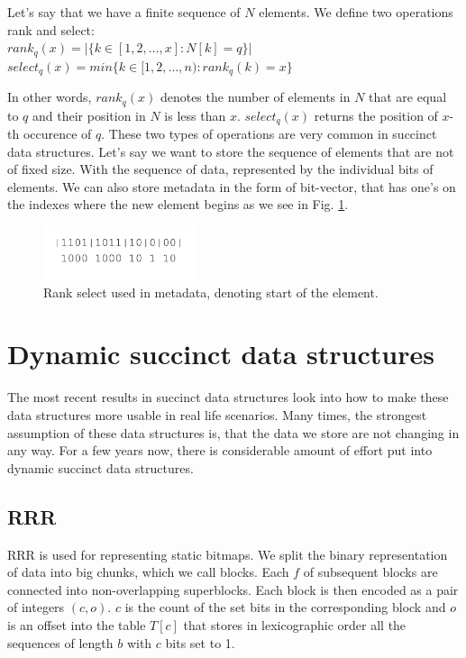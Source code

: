 \begin{theorem}
Let's say that we have a finite sequence of $N$ elements.
We define two operations rank and select: \\
$rank_q(x) = | \{ k \in [ 1, 2, \ldots, x]:N[k] = q  \} |$ \\
$select_q(x) = min \{ k \in [ 1, 2, \ldots, n):rank_q(k)=x  \} $
\end{theorem}

In other words, $rank_q(x)$ denotes the number of elements in $N$ that are equal to $q$ and their position in $N$ is less than $x$. $select_q(x)$ returns the position of $x$-th occurence of $q$.
These two types of operations are very common in succinct data structures. Let's say we want to store the sequence of elements that are not of fixed size.
With the sequence of data, represented by the individual bits of elements. We can also store metadata in the form of bit-vector, that has one's on the indexes
where the new element begins as we see in Fig. \ref{obr:obr_rank_select}.

\begin{figure}
\centerline{\includegraphics[width=0.4\textwidth]{images/obr_rank_select}}
\caption[Rank select usage in representation of sequence of elements with different size]{Rank select used in metadata, denoting start of the element.}
\label{obr:obr_rank_select}
\end{figure}

\section{Dynamic succinct data structures}

The most recent results in succinct data structures look into how to make these data structures more usable in real life scenarios. Many times, the
strongest assumption of these data structures is, that the data we store are not changing in any way. For a few years now, there is considerable amount
of effort put into dynamic succinct data structures. 

\subsection{RRR}

RRR is used for representing static bitmaps. We split the binary representation of data into big chunks, which we call blocks.
Each $f$ of subsequent blocks are connected into non-overlapping superblocks. Each block is then encoded as a pair of integers $(c, o)$. $c$
is the count of the set bits in the corresponding block and $o$ is an offset into the table $T[c]$ that stores in lexicographic order all the sequences of
length $b$ with $c$ bits set to 1.

